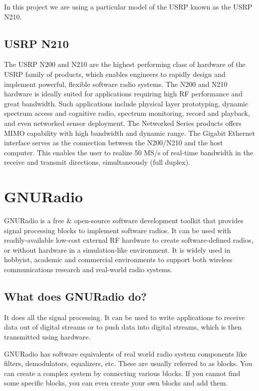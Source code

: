 In this project we are using a particular model of the USRP known as the
USRP N210.

\subsection{USRP N210}

The USRP N200 and N210 are the highest performing class of hardware of the 
USRP family of products, which enables engineers to rapidly design and 
implement powerful, flexible software radio systems. The N200 and N210 
hardware is ideally suited for applications requiring high RF performance and
great bandwidth. Such applications include physical layer prototyping, dynamic
spectrum access and cognitive radio, spectrum monitoring, record and playback,
and even networked sensor deployment. The Networked Series products offers 
MIMO capability with high bandwidth and dynamic range. The Gigabit Ethernet
interface serves as the connection between the N200/N210 and the host 
computer. This enables the user to realize 50 MS/s of real-time bandwidth in 
the receive and transmit directions, simultaneously (full duplex).


\section{GNURadio}

GNURadio is a free \& open-source software development toolkit that provides 
signal processing blocks to implement software radios. It can be used with 
readily-available low-cost external RF hardware to create software-defined 
radios, or without hardware in a simulation-like environment. It is widely 
used in hobbyist, academic and commercial environments to support both 
wireless communications research and real-world radio systems.

\subsection{What does GNURadio do?}
It does all the signal processing. It can be used to write applications to 
receive data out of digital streams or to push data into digital streams, 
which is then transmitted using hardware.

GNURadio has software equivalents of real world radio system components like 
filters, demodulators, equalizers, etc. These are usually referred to as
blocks. You can create a complex system by connecting various blocks. If you
cannot find some specific blocks, you can even create your own blocks and add
them.

